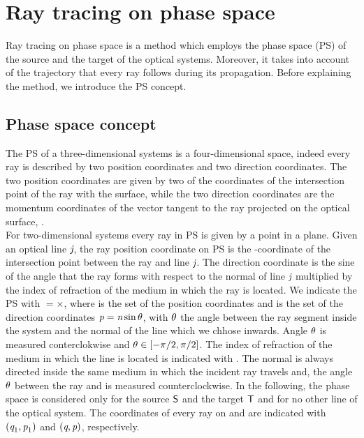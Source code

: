 \chapter{Ray tracing on phase space} \label{chap:PS}
Ray tracing on phase space is a method which employs the phase space (PS) of the source and the target of the optical systems.
Moreover, it takes into account of the trajectory that every ray follows during its propagation.
Before explaining the method, we introduce the PS concept.
\section{Phase space concept}\label{sec:PSconcept}
The PS of a three-dimensional systems is a four-dimensional space, indeed every ray is described by two position coordinates
and two direction coordinates.
The two position coordinates are given by two of the coordinates of the intersection point of the ray with the surface, while the two direction coordinates are
the momentum coordinates of the vector tangent to the ray projected on the optical surface, \cite{wolf2004geometric}.
\\ \indent For two-dimensional systems every ray in PS is given by a point in a plane.
Given an optical line $\textit{j}$, the ray position coordinate on PS is the -coordinate of the intersection point between the ray and line $\textit{j}$.
The direction coordinate is the sine of the angle that the ray forms with respect to the normal of line $\textit{j}$ multiplied by the index of refraction of the medium in which the ray is located.
We indicate the PS with $=$$\times$,
where  is the set of the position coordinates  and  is the set of the direction coordinates $\textit{p}=\textit{n}\sin{\theta}$, with $\theta$ the angle between the ray segment inside the system and the normal \vect{$\boldsymbol{\nu}$} of the line which we chhose inwards. Angle $\theta$ is measured conterclokwise and $\theta \in[-\pi/2, \pi/2]$. The index of refraction of the medium in which the line is located is indicated with .
The normal \vect{$\boldsymbol{\nu}$} is always directed inside the same medium in which the incident ray travels and,
the angle $\theta$ between the ray and \vect{$\boldsymbol{\nu}$} is measured counterclockwise.
In the following, the phase space is considered only for the source $\textsf{S}$ and the target $\textsf{T}$ and for no other line of the optical system.
The coordinates of every ray on  and  are indicated with $(\textit{q}_1,\textit{p}_1)$ and $(\textit{q},\textit{p})$, respectively.\\ \indent
